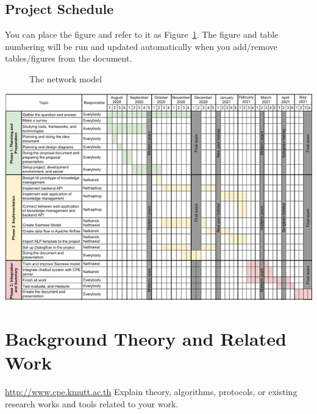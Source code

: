 \documentclass[12pt,oneside,openright,a4paper]{cpe-english-project}
\begin{document}
\section{Project Schedule}
\begin{center}
You can place the figure and refer to it as Figure~\ref{fig:model2}.
The figure and table numbering will be run and updated automatically when you add/remove tables/figures from the document.

\begin{figure}[!h]\centering
\setlength{\fboxrule}{0.2mm} %
\setlength{\fboxsep}{1cm}
\caption{The network model}\label{fig:model2}
\end{figure}
\includegraphics[width=15cm]{ProjectSchedule.jpg}
\end{center}

\chapter{Background Theory and Related Work}

\url{http://www.cpe.kmutt.ac.th}
Explain theory, algorithms, protocols, or existing research works and tools related to your work. \cite{bworld}
\end{document}

